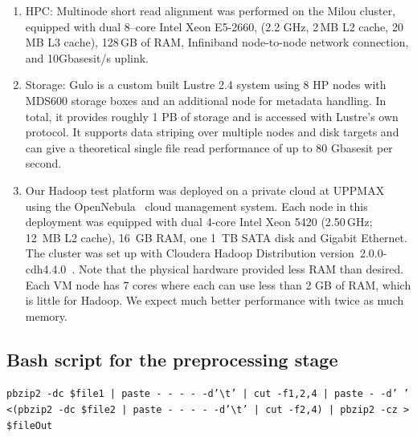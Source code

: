 \documentclass[10pt]{article}
\begin{document}
\begin{enumerate}

\item 
HPC:
Multinode short read alignment was performed on the Milou cluster\cite{milouCluster}, equipped with dual 8--core Intel Xeon E5-2660, (2.2 GHz, 2\,MB L2 cache, 20\,MB L3 cache), 128\,GB of RAM, Infiniband node-to-node network connection, and 10Gbasesit/s uplink.

\item Storage: 
Gulo\cite{gulo} is a custom built Lustre 2.4 system using 8 HP nodes with MDS600 storage boxes and an additional node for metadata handling. In total, it provides roughly 1 PB of storage and is accessed with Lustre's own protocol. It supports data striping over multiple nodes and disk targets and can give a theoretical single file read performance of up to 80 Gbasesit per second.

\item Our Hadoop test platform was deployed on a private cloud at UPPMAX using the OpenNebula~\cite{opennebula} cloud management system. Each node in this deployment was equipped with dual 4-core Intel Xeon 5420 (2.50\,GHz; 12~MB L2 cache), 16~GB RAM, one 1~TB SATA disk and Gigabit Ethernet. The cluster was set up with Cloudera Hadoop Distribution version~2.0.0-cdh4.4.0~\cite{cloudera}.
Note that the physical hardware provided less RAM than desired. Each VM node has 7 cores where each can use less than 2 GB of RAM, which is little for Hadoop. We expect much better performance with twice as much memory.
\end{enumerate}


\subsection*{Bash script for the preprocessing stage}

\texttt {pbzip2 -dc  \${file1} | paste - - - - -d'\textbackslash t' | cut -f1,2,4 | paste - -d' ' <(pbzip2 -dc  \${file2} | paste - - - - -d'\textbackslash t' | cut -f2,4) | pbzip2 -cz > \${fileOut}}
\end{document}
